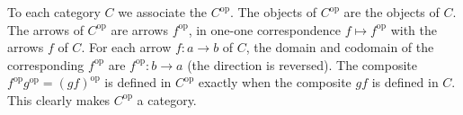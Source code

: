 To each category $C$ we associate the  $C^{\text{op}}$.
The objects of $C^{\text{op}}$ are the objects of $C$.
The arrows of $C^{\text{op}}$ are arrows $f^{\text{op}}$, in one-one correspondence $f \mapsto f^{\text{op}}$ with the arrows $f$ of $C$.
For each arrow $f: a \to b$ of $C$, the domain and codomain of the corresponding $f^{\text{op}}$ are $f^{\text{op}}: b \to a$ (the direction is reversed).
The composite $f^{\text{op}} g^{\text{op}} = (g f)^{\text{op}}$ is defined in $C^{\text{op}}$ exactly when the composite $g f$ is defined in $C$.
This clearly makes $C^{\text{op}}$ a category.
